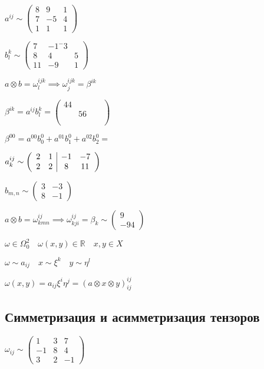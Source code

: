 \documentclass{book}
\newcommand\R{\ensuremath{\mathbb{R}}}
\theoremstyle{definition}
\begin{document}
$a^{ij} \sim \begin{pmatrix} 8 & 9 & 1\\7 & -5 & 4\\ 1 & 1 & 1\end{pmatrix} $ 

$b^k_l \sim \begin{pmatrix} 7 & -1 ^ -3\\ 8 & 4 & 5\\ 11 & -9 & 1 \end{pmatrix} $ 

$a \otimes b = \omega^{ijk}_l \implies  \omega^{ijk}_j = \beta^{ik}$

$\beta^{ik} = a^{ij}b^k_l = \begin{pmatrix} 44 & & \\ & 56 & \\ & & &\\ \end{pmatrix} $

$\beta^{00} = a^{00}b^0_0 + a^{01}b^0_1 + a^{02}b^0_2 = $


$a^{ij}_k \sim \left( 
    \begin{array}{c c | c c}
     2 & 1 & -1 & -7\\
     2 & 2 & 8 & 11\\
\end{array}
\right) $ 

$b_{m, n} \sim \begin{pmatrix} 3 & -3\\ 8 & -1 \end{pmatrix} $ 

$a\otimes b = \omega^{ij}_{kmn} \implies  \omega^{ij}_{kji} = \beta_k \sim \begin{pmatrix} 9\\-94 \end{pmatrix} $

$\omega\in \Omega_0^2\quad \omega(x, y)\in \R\quad x, y\in X$

$\omega \sim  a_{ij}\quad x\sim \xi^k\quad y \sim \eta^l$

$\omega(x, y) = a_{ij}\xi^i\eta^j = (a\otimes x \otimes y)^{ij}_{ij} $

\subsection{Симметризация и асимметризация тензоров}

$\omega_{ij} \sim \begin{pmatrix} 1 & 3 & 7\\-1 & 8 & 4\\ 3 & 2 & -1 \end{pmatrix} $
\end{document}
